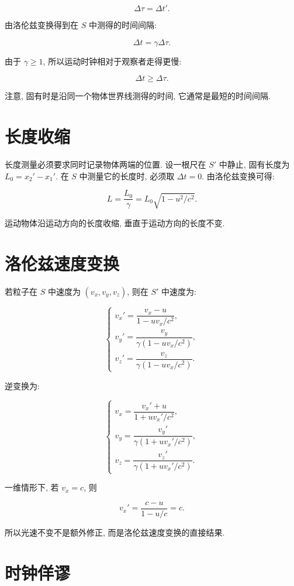 \documentclass[
  a4paper,
]{ctexrep}
\begin{document}
\[
\Delta \tau = \Delta t'.
\]

由洛伦兹变换得到在 \(S\) 中测得的时间间隔:

\[
\Delta t = \gamma \Delta \tau.
\]

由于 \(\gamma \geq 1\), 所以运动时钟相对于观察者走得更慢:

\[
\Delta t \geq \Delta \tau.
\]

注意, 固有时是沿同一个物体世界线测得的时间, 它通常是最短的时间间隔.

\section{长度收缩}\label{ux957fux5ea6ux6536ux7f29}

长度测量必须要求同时记录物体两端的位置. 设一根尺在 \(S'\) 中静止,
固有长度为 \(L_0 = x_2' - x_1'\). 在 \(S\) 中测量它的长度时, 必须取
\(\Delta t = 0\). 由洛伦兹变换可得:

\[
L = \frac{L_0}{\gamma} = L_0\sqrt{1-u^2/c^2}.
\]

运动物体沿运动方向的长度收缩, 垂直于运动方向的长度不变.

\section{洛伦兹速度变换}\label{ux6d1bux4f26ux5179ux901fux5ea6ux53d8ux6362}

若粒子在 \(S\) 中速度为 \((v_x,v_y,v_z)\), 则在 \(S'\) 中速度为:

\[
\begin{cases}
v_x' = \dfrac{v_x-u}{1-uv_x/c^2}, \\
v_y' = \dfrac{v_y}{\gamma(1-uv_x/c^2)}, \\
v_z' = \dfrac{v_z}{\gamma(1-uv_x/c^2)}.
\end{cases}
\]

逆变换为:

\[
\begin{cases}
v_x = \dfrac{v_x'+u}{1+uv_x'/c^2}, \\
v_y = \dfrac{v_y'}{\gamma(1+uv_x'/c^2)}, \\
v_z = \dfrac{v_z'}{\gamma(1+uv_x'/c^2)}.
\end{cases}
\]

一维情形下, 若 \(v_x=c\), 则

\[
v_x' = \frac{c-u}{1-u/c}=c.
\]

所以光速不变不是额外修正, 而是洛伦兹速度变换的直接结果.

\section{时钟佯谬}\label{ux65f6ux949fux4f6fux8c2c}
\end{document}
